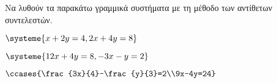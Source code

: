Να λυθούν τα παρακάτω γραμμικά συστήματα με τη μέθοδο των αντίθετων συντελεστών.
\begin{multicols}{2}
\begin{rlist}[leftmargin=5mm]
\item $ \systeme{x+2y=4,2x+4y=8} $
\item $ \systeme{12x+4y=8,-3x-y=2} $
\item $ \ccases{\frac{3x}{4}-\frac{y}{3}=2\\9x-4y=24} $
\end{rlist}
\end{multicols}
